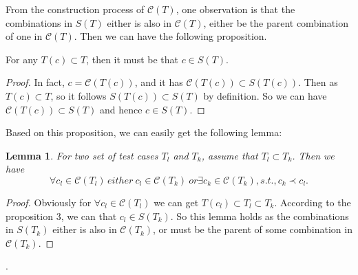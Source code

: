 \documentclass{sig-alternate}
\begin{document}
From the construction process of $\mathcal{C}(T)$, one observation is that the combinations in $S(T)$ either is also in $\mathcal{C}(T)$, either be the parent combination of one in $\mathcal{C}(T)$. Then we can have the following proposition.
\begin{proposition}
 For any $T(c) \subset T$, then it must be that $c \in S(T) $.
\end{proposition}
\begin{proof}
 In fact, $c = \mathcal{C}(T(c))$, and it has $ \mathcal{C}(T(c)) \subset S(T(c)) $. Then as $T(c) \subset T$, so it follows $S(T(c)) \subset S(T)$ by definition. So we can have $\mathcal{C}(T(c)) \subset S(T) $ and hence $c \in S(T)$.
\end{proof}




%

Based on this proposition, we can easily get the following lemma:
\newtheorem{lemma}{Lemma}
\begin{lemma}
For two set of test cases $T_{l}$ and $T_{k}$, assume that $T_{l} \subset T_{k}$. Then we have
 \begin{displaymath} \forall c_{l} \in \mathcal{C}(T_{l})\,  either\ c_{l} \in \mathcal{C}(T_{k})\ or \exists c_{k} \in \mathcal{C}(T_{k}), s.t., c_{k} \prec c_{l}.
 \end{displaymath}
\end{lemma}

\begin{proof}
Obviously for $\forall c_{l} \in \mathcal{C}(T_{l}) $ we can get $T(c_{l}) \subset T_{l} \subset T_{k}$. According to the proposition 3, we can that $c_{l} \in S(T_{k})$. So this lemma holds as the combinations in $S(T_{k})$ either is also in $\mathcal{C}(T_{k})$, or must be the parent of some combination in $\mathcal{C}(T_{k})$.
\end{proof}.

\end{document}
